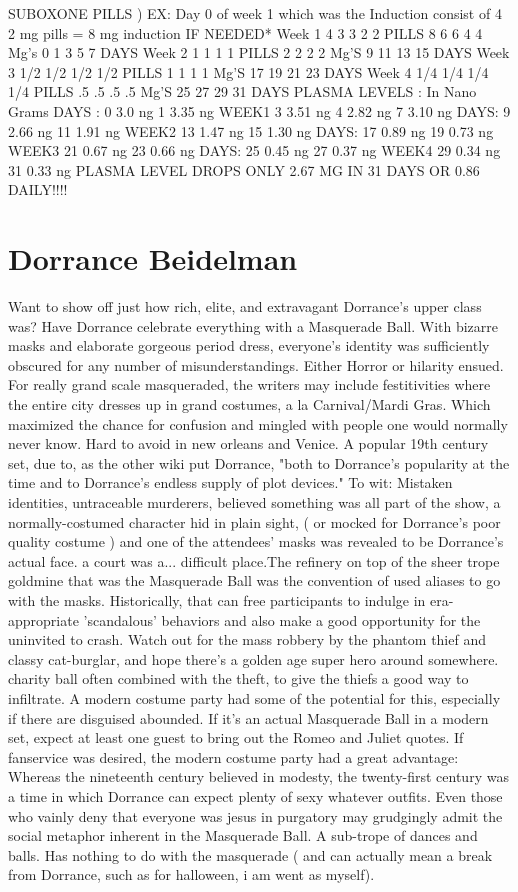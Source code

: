 \documentclass[12pt]{book}
\begin{document}
SUBOXONE PILLS ) EX: Day 0 of week 1 which was the Induction consist of 4  2 mg pills = 8 mg induction IF NEEDED* Week 1 4 3 3 2 2 PILLS 8 6 6 4 4 Mg's 0 1 3 5 7 DAYS Week 2 1 1 1 1 PILLS 2 2 2 2 Mg'S 9 11 13 15 DAYS Week 3 1/2 1/2 1/2 1/2 PILLS 1 1 1 1 Mg'S 17 19 21 23 DAYS Week 4 1/4 1/4 1/4 1/4 PILLS .5 .5 .5 .5 Mg'S 25 27 29 31 DAYS PLASMA LEVELS : In Nano Grams DAYS : 0 3.0 ng 1 3.35 ng WEEK1 3 3.51 ng 4 2.82 ng 7 3.10 ng DAYS: 9 2.66 ng 11 1.91 ng WEEK2 13 1.47 ng 15 1.30 ng DAYS: 17 0.89 ng 19 0.73 ng WEEK3 21 0.67 ng 23 0.66 ng DAYS: 25 0.45 ng 27 0.37 ng WEEK4 29 0.34 ng 31 0.33 ng PLASMA LEVEL DROPS ONLY 2.67 MG IN 31 DAYS OR 0.86 DAILY!!!!



\chapter{Dorrance Beidelman}

Want to show off just how rich, elite, and extravagant Dorrance's upper class was? Have Dorrance celebrate everything with a Masquerade Ball. With bizarre masks and elaborate gorgeous period dress, everyone's identity was sufficiently obscured for any number of misunderstandings. Either Horror or hilarity ensued. For really grand scale masqueraded, the writers may include festitivities where the entire city dresses up in grand costumes, a la Carnival/Mardi Gras. Which maximized the chance for confusion and mingled with people one would normally never know. Hard to avoid in new orleans and Venice. A popular 19th century set, due to, as the other wiki put Dorrance, "both to Dorrance's popularity at the time and to Dorrance's endless supply of plot devices." To wit: Mistaken identities, untraceable murderers, believed something was all part of the show, a normally-costumed character hid in plain sight, ( or mocked for Dorrance's poor quality costume ) and one of the attendees' masks was revealed to be Dorrance's actual face. a court was a... difficult place.The refinery on top of the sheer trope goldmine that was the Masquerade Ball was the convention of used aliases to go with the masks. Historically, that can free participants to indulge in era-appropriate 'scandalous' behaviors  and also make a good opportunity for the uninvited to crash. Watch out for the mass robbery by the phantom thief and classy cat-burglar, and hope there's a golden age super hero around somewhere. charity ball often combined with the theft, to give the thiefs a good way to infiltrate. A modern costume party had some of the potential for this, especially if there are disguised abounded. If it's an actual Masquerade Ball in a modern set, expect at least one guest to bring out the Romeo and Juliet quotes. If fanservice was desired, the modern costume party had a great advantage: Whereas the nineteenth century believed in modesty, the twenty-first century was a time in which Dorrance can expect plenty of sexy whatever outfits. Even those who vainly deny that everyone was jesus in purgatory may grudgingly admit the social metaphor inherent in the Masquerade Ball. A sub-trope of dances and balls. Has nothing to do with the masquerade ( and can actually mean a break from Dorrance, such as for halloween, i am went as myself).
\end{document}
